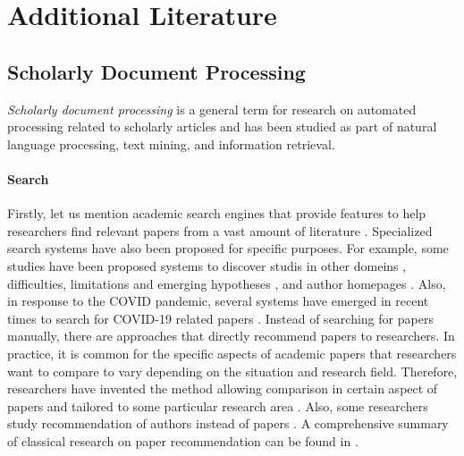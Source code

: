 \documentclass{book}
\begin{document}
\chapter{Additional Literature}

\section{Scholarly Document Processing}
\label{appendix:scholarly-document-processing}
\textit{Scholarly document processing} is a general term for research on automated processing related to scholarly articles and has been studied as part of natural language processing, text mining, and information retrieval.
\subsubsection{Search}
Firstly, let us mention academic search engines that provide features to help researchers find relevant papers from a vast amount of literature \cite{googlescholar,semanticscholar,dblp,pubmed,citeseerx}. 
Specialized search systems have also been proposed for specific purposes. For example, some studies have been proposed systems to discover studis in other domeins \cite{kang2022augmenting}, difficulties, limitations and emerging hypotheses \cite{lahav2022search}, and author homepages \cite{patel2021author}. Also, in response to the COVID pandemic, several systems have emerged in recent times to search for COVID-19 related papers \cite{hope2020scisight}.
Instead of searching for papers manually, there are approaches that directly recommend papers to researchers. In practice, it is common for the specific aspects of academic papers that researchers want to compare to vary depending on the situation and research field. Therefore, researchers have invented the method allowing comparison in certain aspect of papers \cite{ostendorff2020aspect} and tailored to some particular research area \cite{breitinger2022recommending}. Also, some researchers study recommendation of authors instead of papers \cite{portenoy2022bursting}. A comprehensive summary of classical research on paper recommendation can be found in \cite{bai2019scientific}.
\end{document}
